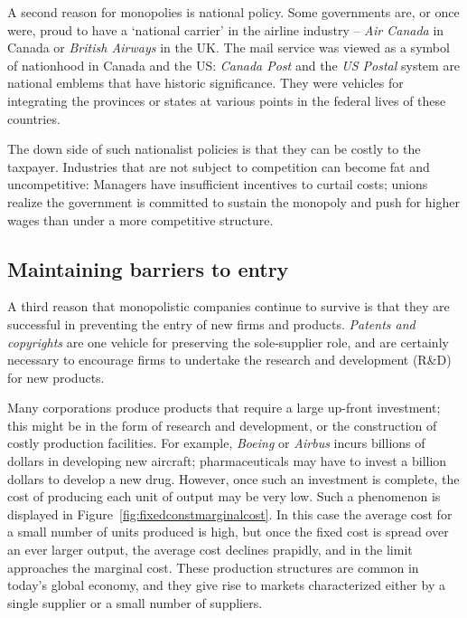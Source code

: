 A second reason for monopolies is national policy. Some governments are, or
once were, proud to have a `national carrier' in the airline industry -- \textit{Air
Canada} in Canada or \textit{British Airways} in the UK. The mail service was viewed
as a symbol of nationhood in Canada and the US: \textit{Canada Post} and the 
\textit{US Postal} system are national emblems that have historic
significance. They were vehicles for integrating the provinces or states at
various points in the federal lives of these countries.

The down side of such nationalist policies is that they can be costly to the
taxpayer. Industries that are not subject to competition can become fat and
uncompetitive: Managers have insufficient incentives to curtail costs;
unions realize the government is committed to sustain the monopoly and push
for higher wages than under a more competitive structure.

\newhtmlpage

\subsection*{Maintaining barriers to entry}

A third reason that monopolistic companies continue to survive is that they
are successful in preventing the entry of new firms and products. 
\textit{Patents and copyrights} are one vehicle for preserving the sole-supplier
role, and are certainly necessary to encourage firms to undertake the
research and development (R\&D) for new products.

Many corporations produce products that require a large up-front investment;
this might be in the form of research and development, or the construction
of costly production facilities. For example, \textit{Boeing} or \textit{%
	Airbus} incurs billions of dollars in developing new aircraft;
pharmaceuticals may have to invest a billion dollars to develop a new drug.
However, once such an investment is complete, the cost of producing each
unit of output may be very low. Such a phenomenon is displayed in Figure~\ref{fig:fixedconstmarginalcost}.
In this case the average cost for a small
number of units produced is high, but once the fixed cost is spread over an
ever larger output, the average cost declines prapidly, and in the limit
approaches the marginal cost. These production structures are common in
today's global economy, and they give rise to markets characterized either
by a single supplier or a small number of suppliers.

